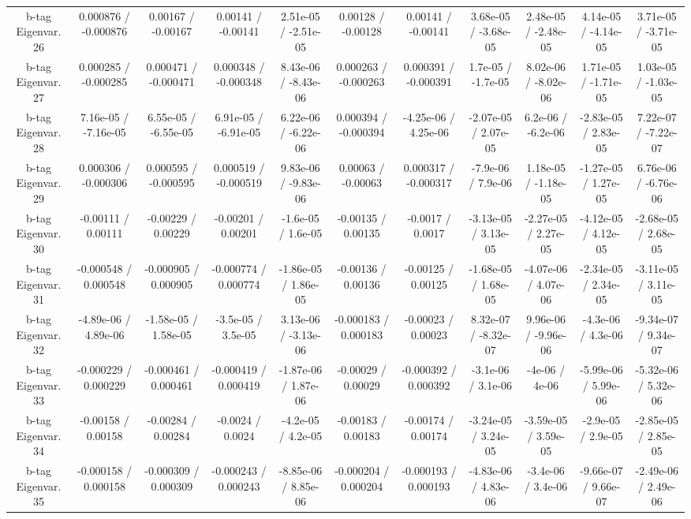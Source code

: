 \begin{table}[htbp]
\begin{center}
\begin{tabular}{|c|c|c|c|c|c|c|c|c|c|c|}
  b-tag Eigenvar. 26 & 0.000876 / -0.000876 & 0.00167 / -0.00167 & 0.00141 / -0.00141 & 2.51e-05 / -2.51e-05 & 0.00128 / -0.00128 & 0.00141 / -0.00141 & 3.68e-05 / -3.68e-05 & 2.48e-05 / -2.48e-05 & 4.14e-05 / -4.14e-05 & 3.71e-05 / -3.71e-05 \\ 
  b-tag Eigenvar. 27 & 0.000285 / -0.000285 & 0.000471 / -0.000471 & 0.000348 / -0.000348 & 8.43e-06 / -8.43e-06 & 0.000263 / -0.000263 & 0.000391 / -0.000391 & 1.7e-05 / -1.7e-05 & 8.02e-06 / -8.02e-06 & 1.71e-05 / -1.71e-05 & 1.03e-05 / -1.03e-05 \\ 
  b-tag Eigenvar. 28 & 7.16e-05 / -7.16e-05 & 6.55e-05 / -6.55e-05 & 6.91e-05 / -6.91e-05 & 6.22e-06 / -6.22e-06 & 0.000394 / -0.000394 & -4.25e-06 / 4.25e-06 & -2.07e-05 / 2.07e-05 & 6.2e-06 / -6.2e-06 & -2.83e-05 / 2.83e-05 & 7.22e-07 / -7.22e-07 \\ 
  b-tag Eigenvar. 29 & 0.000306 / -0.000306 & 0.000595 / -0.000595 & 0.000519 / -0.000519 & 9.83e-06 / -9.83e-06 & 0.00063 / -0.00063 & 0.000317 / -0.000317 & -7.9e-06 / 7.9e-06 & 1.18e-05 / -1.18e-05 & -1.27e-05 / 1.27e-05 & 6.76e-06 / -6.76e-06 \\ 
  b-tag Eigenvar. 30 & -0.00111 / 0.00111 & -0.00229 / 0.00229 & -0.00201 / 0.00201 & -1.6e-05 / 1.6e-05 & -0.00135 / 0.00135 & -0.0017 / 0.0017 & -3.13e-05 / 3.13e-05 & -2.27e-05 / 2.27e-05 & -4.12e-05 / 4.12e-05 & -2.68e-05 / 2.68e-05 \\ 
  b-tag Eigenvar. 31 & -0.000548 / 0.000548 & -0.000905 / 0.000905 & -0.000774 / 0.000774 & -1.86e-05 / 1.86e-05 & -0.00136 / 0.00136 & -0.00125 / 0.00125 & -1.68e-05 / 1.68e-05 & -4.07e-06 / 4.07e-06 & -2.34e-05 / 2.34e-05 & -3.11e-05 / 3.11e-05 \\ 
  b-tag Eigenvar. 32 & -4.89e-06 / 4.89e-06 & -1.58e-05 / 1.58e-05 & -3.5e-05 / 3.5e-05 & 3.13e-06 / -3.13e-06 & -0.000183 / 0.000183 & -0.00023 / 0.00023 & 8.32e-07 / -8.32e-07 & 9.96e-06 / -9.96e-06 & -4.3e-06 / 4.3e-06 & -9.34e-07 / 9.34e-07 \\ 
  b-tag Eigenvar. 33 & -0.000229 / 0.000229 & -0.000461 / 0.000461 & -0.000419 / 0.000419 & -1.87e-06 / 1.87e-06 & -0.00029 / 0.00029 & -0.000392 / 0.000392 & -3.1e-06 / 3.1e-06 & -4e-06 / 4e-06 & -5.99e-06 / 5.99e-06 & -5.32e-06 / 5.32e-06 \\ 
  b-tag Eigenvar. 34 & -0.00158 / 0.00158 & -0.00284 / 0.00284 & -0.0024 / 0.0024 & -4.2e-05 / 4.2e-05 & -0.00183 / 0.00183 & -0.00174 / 0.00174 & -3.24e-05 / 3.24e-05 & -3.59e-05 / 3.59e-05 & -2.9e-05 / 2.9e-05 & -2.85e-05 / 2.85e-05 \\ 
  b-tag Eigenvar. 35 & -0.000158 / 0.000158 & -0.000309 / 0.000309 & -0.000243 / 0.000243 & -8.85e-06 / 8.85e-06 & -0.000204 / 0.000204 & -0.000193 / 0.000193 & -4.83e-06 / 4.83e-06 & -3.4e-06 / 3.4e-06 & -9.66e-07 / 9.66e-07 & -2.49e-06 / 2.49e-06 \\ 

\end{tabular}
\end{center}
\end{table}
